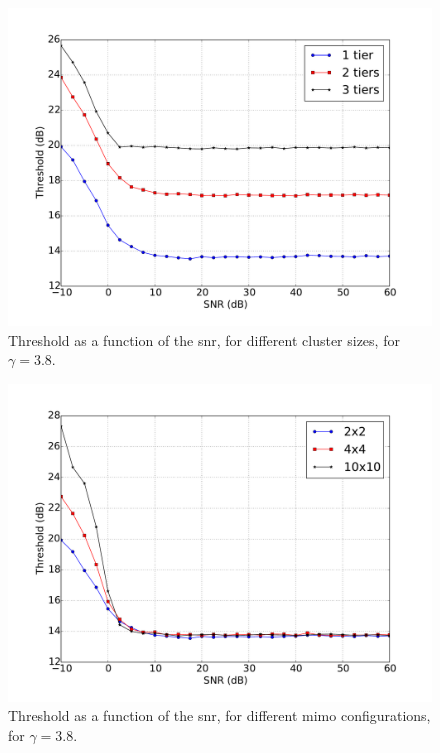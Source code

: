 \begin{figure}[t]
	\centering
	\includegraphics[width=0.75\columnwidth]{./21.appendices/figure/threshold_snr_tiers_02x02_c02_r1300}
    \caption{Threshold as a function of the \gls{snr}, for different cluster
    sizes, for $\gamma = 3.8$.}
	\label{fig:th_snr_tiers}
\end{figure}

\begin{figure}[t]
	\centering
	\includegraphics[width=0.75\columnwidth]{./21.appendices/figure/threshold_snr_anten_02x02_t02_i01_r1300}
    \caption{Threshold as a function of the \gls{snr}, for different \gls{mimo}
    configurations, for $\gamma = 3.8$.}
	\label{fig:th_snr_ant}
\end{figure}

